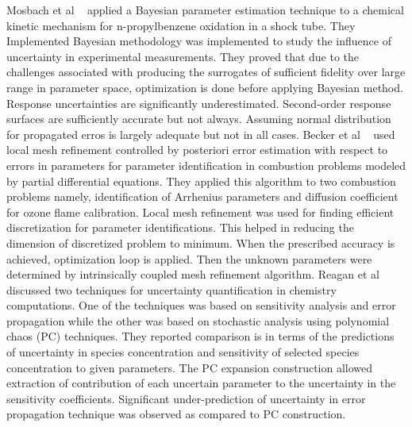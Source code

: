 Mosbach et al ~\cite{Mosbach} applied a Bayesian parameter estimation technique to a chemical kinetic mechanism for n-propylbenzene oxidation in a shock tube. They Implemented Bayesian methodology was implemented to study the influence of uncertainty in experimental measurements. They proved that  due to the challenges associated with producing the surrogates of sufficient fidelity over large range in parameter space, optimization is done before applying Bayesian method. Response uncertainties are significantly underestimated. Second-order response surfaces are sufficiently accurate but not always. Assuming normal distribution for propagated erros is largely adequate but not in all cases. Becker et al ~\cite{Becker} used local mesh refinement controlled by posteriori error estimation with respect to errors in parameters for parameter identification in combustion problems modeled by partial differential equations. They applied this algorithm to two combustion problems namely, identification of Arrhenius parameters and diffusion coefficient for ozone flame calibration. Local mesh refinement was used for finding efficient discretization for parameter identifications. This helped in reducing the dimension of discretized problem to minimum. When the prescribed accuracy is achieved, optimization loop is applied. Then the unknown parameters were determined by intrinsically coupled mesh refinement algorithm. Reagan et al ~\cite{Reagan} discussed two techniques for uncertainty quantification in chemistry computations. One of the techniques was based on sensitivity analysis and error propagation while the other was based on stochastic analysis using polynomial chaos (PC) techniques. They reported comparison is in terms of the predictions of uncertainty in species concentration and sensitivity of selected species concentration to given parameters. The PC expansion construction allowed extraction of contribution of each uncertain parameter to the uncertainty in the sensitivity coefficients. Significant under-prediction of uncertainty in error propagation technique was observed as compared to PC construction. 


